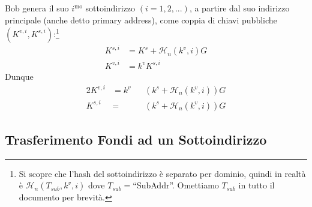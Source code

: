 Bob genera il suo $i^\text{mo}$ sottoindirizzo $(i = 1, 2, ...)$, a partire dal suo indirizzo principale (anche detto primary address), come coppia di chiavi pubbliche $(K^{v,i}, K^{s,i})$:\footnote{Si scopre che l’hash del sottoindirizzo è separato per dominio, quindi in realtà è $\mathcal{H}_n(T_{sub},k^v,i)$ dove $T_{sub} = $“SubAddr”. Omettiamo $T_{sub}$ in tutto il documento per brevità.}\vspace{.175cm}
\begin{align*}
    K^{s,i} &= K^s + \mathcal{H}_n(k^v, i) G\\
    K^{v,i} &= k^v K^{s,i}
\end{align*}
\quad Dunque
\begin{alignat*}{2}
    K^{v,i} &= k^v&&(k^s + \mathcal{H}_n(k^v, i))G\\
    K^{s,i} &= &&(k^s + \mathcal{H}_n(k^v, i))G
\end{alignat*}
    

\subsection{Trasferimento Fondi ad un Sottoindirizzo}
    
